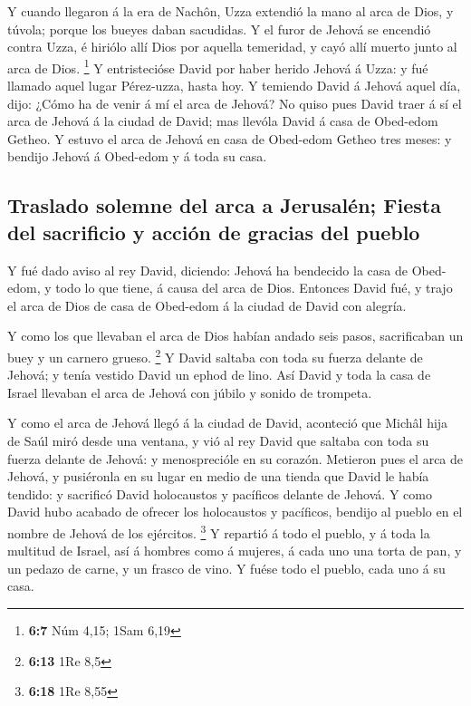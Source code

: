  Y cuando llegaron á la era de Nachôn, Uzza extendió la
mano al arca de Dios, y túvola; porque los bueyes daban sacudidas.
 Y el furor de Jehová se encendió contra Uzza, é hiriólo
allí Dios por aquella temeridad, y cayó allí muerto junto al arca de
Dios. \footnote{\textbf{6:7} Núm 4,15; 1Sam 6,19}  Y
entristecióse David por haber herido Jehová á Uzza: y fué llamado aquel
lugar Pérez-uzza, hasta hoy.  Y temiendo David á Jehová
aquel día, dijo: ¿Cómo ha de venir á mí el arca de Jehová?
 No quiso pues David traer á sí el arca de Jehová á la
ciudad de David; mas llevóla David á casa de Obed-edom Getheo.
 Y estuvo el arca de Jehová en casa de Obed-edom Getheo
tres meses: y bendijo Jehová á Obed-edom y á toda su casa.

\hypertarget{traslado-solemne-del-arca-a-jerusaluxe9n-fiesta-del-sacrificio-y-acciuxf3n-de-gracias-del-pueblo}{%
\subsection{Traslado solemne del arca a Jerusalén; Fiesta del sacrificio
y acción de gracias del
pueblo}\label{traslado-solemne-del-arca-a-jerusaluxe9n-fiesta-del-sacrificio-y-acciuxf3n-de-gracias-del-pueblo}}

 Y fué dado aviso al rey David, diciendo: Jehová ha
bendecido la casa de Obed-edom, y todo lo que tiene, á causa del arca de
Dios. Entonces David fué, y trajo el arca de Dios de casa de Obed-edom á
la ciudad de David con alegría.

 Y como los que llevaban el arca de Dios habían andado
seis pasos, sacrificaban un buey y un carnero grueso. \footnote{\textbf{6:13}
  1Re 8,5}  Y David saltaba con toda su fuerza delante de
Jehová; y tenía vestido David un ephod de lino.  Así
David y toda la casa de Israel llevaban el arca de Jehová con júbilo y
sonido de trompeta.

 Y como el arca de Jehová llegó á la ciudad de David,
aconteció que Michâl hija de Saúl miró desde una ventana, y vió al rey
David que saltaba con toda su fuerza delante de Jehová: y menosprecióle
en su corazón.  Metieron pues el arca de Jehová, y
pusiéronla en su lugar en medio de una tienda que David le había
tendido: y sacrificó David holocaustos y pacíficos delante de Jehová.
 Y como David hubo acabado de ofrecer los holocaustos y
pacíficos, bendijo al pueblo en el nombre de Jehová de los ejércitos.
\footnote{\textbf{6:18} 1Re 8,55}  Y repartió á todo el
pueblo, y á toda la multitud de Israel, así á hombres como á mujeres, á
cada uno una torta de pan, y un pedazo de carne, y un frasco de vino. Y
fuése todo el pueblo, cada uno á su casa.

